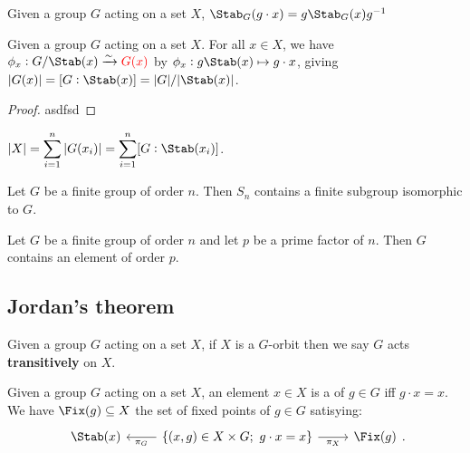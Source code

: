 \documentclass[../Year2.tex]{subfiles}
\begin{document}
\begin{lemma}
    Given a group $G$ acting on a set $X$, $\Stab_G(g\cdot x)=g\Stab_G(x)g^{-1}$
\end{lemma}

\begin{theorem}
    Given a group $G$ acting on a set $X$. For all $x\in X$, we have $\phi_x:G/\Stab(x)\xrightarrow{\sim}\textcolor{red}{G(x)}$ by $\phi_x:g\Stab(x)\mapsto g\cdot x$, giving $|G(x)| = [G:\Stab(x)] = |G|/|\Stab(x)|$.
    \begin{proof}
        asdfsd
    \end{proof}
\end{theorem}

\vspace{-15pt}

\begin{corollary}
    $\displaystyle|X| = \sum_{i=1}^n|G(x_i)| = \sum_{i=1}^n[G:\Stab(x_i)]$. 
\end{corollary}

\begin{corollary}
    Let $G$ be a finite group of order $n$. Then $S_n$ contains a finite subgroup isomorphic to $G$.
\end{corollary}

\begin{corollary}
    Let $G$ be a finite group of order $n$ and let $p$ be a prime factor of $n$. Then $G$ contains an element of order $p$.
\end{corollary}

\subsection{Jordan's theorem}

\begin{definition}
    Given a group $G$ acting on a set $X$, if $X$ is a $G$-orbit then we say $G$ acts \textbf{transitively} on $X$.
\end{definition}

\begin{definition}
    Given a group $G$ acting on a set $X$, an element $x\in X$ is a  of $g\in G$ iff $g\cdot x=x$. We have $\Fix(g)\subseteq X$ the set of fixed points of $g\in G$ satisying: \[
        \begin{tikzcd}
            \Stab(x) & \arrow[l, "\pi_G"] \{(x,g)\in X\times G; \  g\cdot x = x\} \arrow[r, swap, "\pi_X"] & \Fix(g)
        \end{tikzcd}
        \black{.}
    \]
\end{definition}
\end{document}
